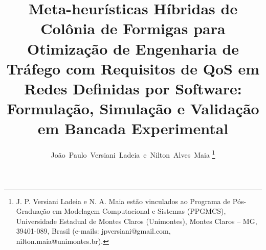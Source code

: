 \documentclass[journal]{IEEEtran}
\begin{document}
\title{Meta-heur\'{i}sticas H\'{i}bridas de Col\^{o}nia de Formigas para Otimiza\c{c}\~{a}o de Engenharia de Tr\'{a}fego com Requisitos de QoS em Redes Definidas por Software: Formula\c{c}\~{a}o, Simula\c{c}\~{a}o e Valida\c{c}\~{a}o em Bancada Experimental}

\author{Jo\~{a}o~Paulo~Versiani~Ladeia~e~Nilton~Alves~Maia%
\thanks{J. P. Versiani Ladeia e N. A. Maia est\~{a}o vinculados ao Programa de P\'{o}s-Gradua\c{c}\~{a}o em Modelagem Computacional e Sistemas (PPGMCS), Universidade Estadual de Montes Claros (Unimontes), Montes Claros -- MG, 39401-089, Brasil (e-mails: jpversiani@gmail.com, nilton.maia@unimontes.br).}}


\maketitle
\end{document}
